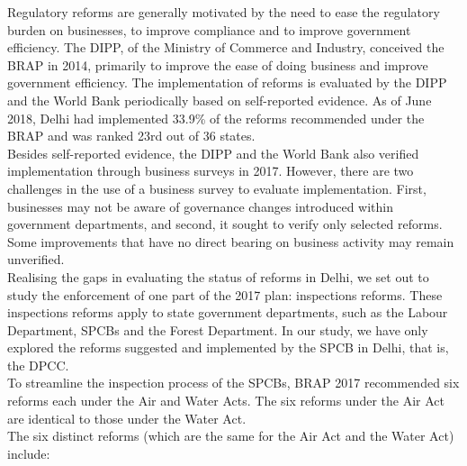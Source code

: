 \documentclass[a4paper, 12pt]{article}
\begin{document}
                 Regulatory reforms are generally motivated by the need to ease the regulatory burden on businesses, to improve compliance and to improve government efficiency. The DIPP, of the Ministry of Commerce and Industry, conceived the BRAP in 2014, primarily to improve the ease of doing business and improve government efficiency. The implementation of reforms is evaluated by the DIPP and the World Bank periodically based on self-reported evidence. As of June 2018, Delhi had implemented 33.9\% of the reforms recommended under the BRAP and was ranked 23rd out of 36 states. \\
                 
                 Besides self-reported evidence, the DIPP and the World Bank also verified implementation through business surveys in 2017. However, there are two challenges in the use of a business survey to evaluate implementation. First, businesses may not be aware of governance changes introduced within government departments, and second, it sought to verify only selected reforms. Some improvements that have no direct bearing on business activity may remain unverified. \\
                 
                 Realising the gaps in evaluating the status of reforms in Delhi, we set out to study the enforcement of one part of the 2017 plan: inspections reforms. These inspections reforms apply to state government departments, such as the Labour Department, SPCBs and the Forest Department. In our study, we have only explored the reforms suggested and implemented by the SPCB in Delhi, that is, the DPCC. \\
                 
                 To streamline the inspection process of the SPCBs, BRAP 2017 recommended six reforms each under the Air and Water Acts. The six reforms under the Air Act are identical to those under the Water Act. \\
                 
                 The six distinct reforms (which are the same for the Air Act and the Water Act) include: 
                 
\end{document}
